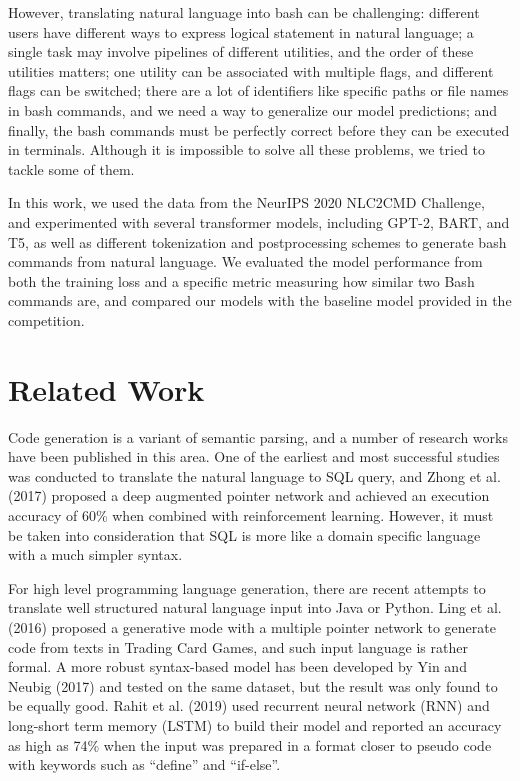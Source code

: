 \documentclass{article}
\begin{document}
However, translating natural language into bash can be challenging: different
users have different ways to express logical statement in natural language; a
single task may involve pipelines of different utilities, and the order of
these utilities matters; one utility can be associated with multiple flags, and
different flags can be switched; there are a lot of identifiers like specific
paths or file names in bash commands, and we need a way to generalize our model
predictions; and finally, the bash commands must be perfectly correct before
they can be executed in terminals. Although it is impossible to solve all these
problems, we tried to tackle some of them.

In this work, we used the data from the NeurIPS 2020 NLC2CMD Challenge, and
experimented with several transformer models, including GPT-2, BART, and T5, as
well as different tokenization and postprocessing schemes to generate bash
commands from natural language. We evaluated the model performance from both
the training loss and a specific metric measuring how similar two Bash commands
are, and compared our models with the baseline model provided in the
competition.


\section{Related Work}
Code generation is a variant of semantic parsing, and a number of research
works have been published in this area. One of the earliest and most successful
studies was conducted to translate the natural language to SQL query, and Zhong
et al. (2017) \cite{zhong2017seq2sql} proposed a deep augmented pointer network
and achieved an execution accuracy of 60\% when combined with reinforcement
learning. However, it must be taken into consideration that SQL is more like a
domain specific language with a much simpler syntax.

For high level programming language generation, there are recent attempts to
translate well structured natural language input into Java or Python.  Ling et
al. (2016) \cite{ling2016latent} proposed a generative mode with a multiple
pointer network to generate code from texts in Trading Card Games, and such
input language is rather formal. A more robust syntax-based model has been
developed by Yin and Neubig (2017) \cite{yin2017syntactic} and tested on the
same dataset, but the result was only found to be equally good. Rahit et al.
(2019) \cite{rahit2019machine} used recurrent neural network (RNN) and
long-short term memory (LSTM) to build their model and reported an accuracy as
high as 74\% when the input was prepared in a format closer to pseudo code with
keywords such as “define” and “if-else”.
\end{document}
